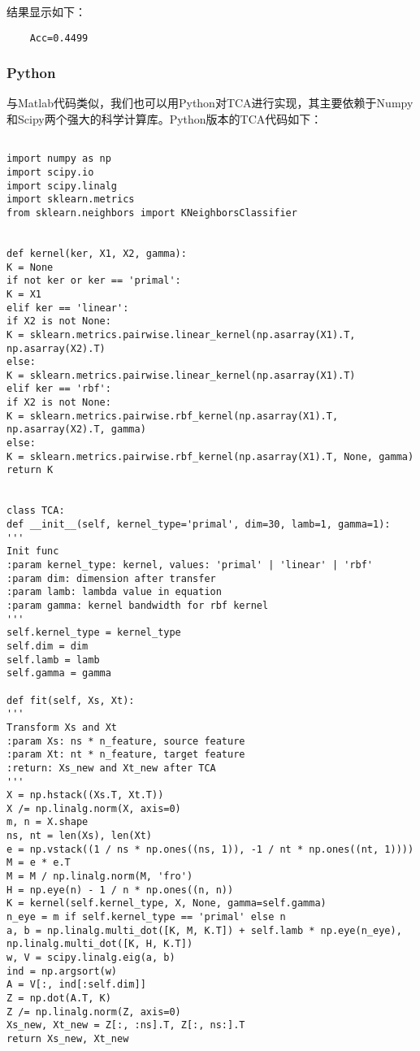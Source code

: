 结果显示如下：
\begin{lstlisting}
	Acc=0.4499
\end{lstlisting}

\subsubsection{Python}

与Matlab代码类似，我们也可以用Python对TCA进行实现，其主要依赖于Numpy和Scipy两个强大的科学计算库。Python版本的TCA代码如下：

\begin{lstlisting}[title=TCA方法的Matlab实现, frame=shadowbox]

import numpy as np
import scipy.io
import scipy.linalg
import sklearn.metrics
from sklearn.neighbors import KNeighborsClassifier


def kernel(ker, X1, X2, gamma):
K = None
if not ker or ker == 'primal':
K = X1
elif ker == 'linear':
if X2 is not None:
K = sklearn.metrics.pairwise.linear_kernel(np.asarray(X1).T, np.asarray(X2).T)
else:
K = sklearn.metrics.pairwise.linear_kernel(np.asarray(X1).T)
elif ker == 'rbf':
if X2 is not None:
K = sklearn.metrics.pairwise.rbf_kernel(np.asarray(X1).T, np.asarray(X2).T, gamma)
else:
K = sklearn.metrics.pairwise.rbf_kernel(np.asarray(X1).T, None, gamma)
return K


class TCA:
def __init__(self, kernel_type='primal', dim=30, lamb=1, gamma=1):
'''
Init func
:param kernel_type: kernel, values: 'primal' | 'linear' | 'rbf'
:param dim: dimension after transfer
:param lamb: lambda value in equation
:param gamma: kernel bandwidth for rbf kernel
'''
self.kernel_type = kernel_type
self.dim = dim
self.lamb = lamb
self.gamma = gamma

def fit(self, Xs, Xt):
'''
Transform Xs and Xt
:param Xs: ns * n_feature, source feature
:param Xt: nt * n_feature, target feature
:return: Xs_new and Xt_new after TCA
'''
X = np.hstack((Xs.T, Xt.T))
X /= np.linalg.norm(X, axis=0)
m, n = X.shape
ns, nt = len(Xs), len(Xt)
e = np.vstack((1 / ns * np.ones((ns, 1)), -1 / nt * np.ones((nt, 1))))
M = e * e.T
M = M / np.linalg.norm(M, 'fro')
H = np.eye(n) - 1 / n * np.ones((n, n))
K = kernel(self.kernel_type, X, None, gamma=self.gamma)
n_eye = m if self.kernel_type == 'primal' else n
a, b = np.linalg.multi_dot([K, M, K.T]) + self.lamb * np.eye(n_eye), np.linalg.multi_dot([K, H, K.T])
w, V = scipy.linalg.eig(a, b)
ind = np.argsort(w)
A = V[:, ind[:self.dim]]
Z = np.dot(A.T, K)
Z /= np.linalg.norm(Z, axis=0)
Xs_new, Xt_new = Z[:, :ns].T, Z[:, ns:].T
return Xs_new, Xt_new


\end{lstlisting}

